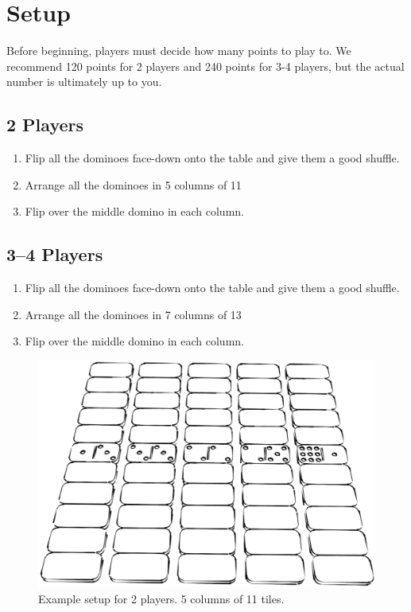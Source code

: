 \section{Setup}
Before beginning, players must decide how many points to play to. 
We recommend 120 points for 2 players and 240 points for 3-4 players, but the actual number is ultimately up to you.
\subsection{2 Players}

\begin{enumerate}
    \item Flip all the dominoes face-down onto the table and give them a good shuffle.
    \item Arrange all the dominoes in 5 columns of 11
    \item Flip over the middle domino in each column.
\end{enumerate}

\subsection{3--4 Players}

\begin{enumerate}
    \item Flip all the dominoes face-down onto the table and give them a good shuffle.
    \item Arrange all the dominoes in 7 columns of 13
    \item Flip over the middle domino in each column.
\end{enumerate}

\begin{figure}[ht]
\centering
\includegraphics[width = \linewidth]{graphics/dominoes-setup.png}
\caption{Example setup for 2 players. 5 columns of 11 tiles.}
\end{figure}
